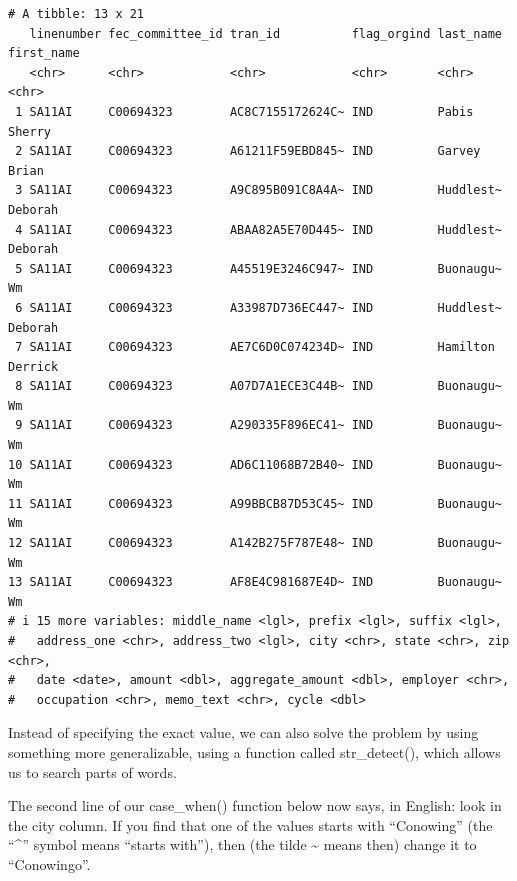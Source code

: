 \documentclass[
  letterpaper,
  DIV=11,
  numbers=noendperiod]{scrreprt}
\begin{document}
\begin{verbatim}
# A tibble: 13 x 21
   linenumber fec_committee_id tran_id          flag_orgind last_name first_name
   <chr>      <chr>            <chr>            <chr>       <chr>     <chr>     
 1 SA11AI     C00694323        AC8C7155172624C~ IND         Pabis     Sherry    
 2 SA11AI     C00694323        A61211F59EBD845~ IND         Garvey    Brian     
 3 SA11AI     C00694323        A9C895B091C8A4A~ IND         Huddlest~ Deborah   
 4 SA11AI     C00694323        ABAA82A5E70D445~ IND         Huddlest~ Deborah   
 5 SA11AI     C00694323        A45519E3246C947~ IND         Buonaugu~ Wm        
 6 SA11AI     C00694323        A33987D736EC447~ IND         Huddlest~ Deborah   
 7 SA11AI     C00694323        AE7C6D0C074234D~ IND         Hamilton  Derrick   
 8 SA11AI     C00694323        A07D7A1ECE3C44B~ IND         Buonaugu~ Wm        
 9 SA11AI     C00694323        A290335F896EC41~ IND         Buonaugu~ Wm        
10 SA11AI     C00694323        AD6C11068B72B40~ IND         Buonaugu~ Wm        
11 SA11AI     C00694323        A99BBCB87D53C45~ IND         Buonaugu~ Wm        
12 SA11AI     C00694323        A142B275F787E48~ IND         Buonaugu~ Wm        
13 SA11AI     C00694323        AF8E4C981687E4D~ IND         Buonaugu~ Wm        
# i 15 more variables: middle_name <lgl>, prefix <lgl>, suffix <lgl>,
#   address_one <chr>, address_two <lgl>, city <chr>, state <chr>, zip <chr>,
#   date <date>, amount <dbl>, aggregate_amount <dbl>, employer <chr>,
#   occupation <chr>, memo_text <chr>, cycle <dbl>
\end{verbatim}

Instead of specifying the exact value, we can also solve the problem by
using something more generalizable, using a function called
str\_detect(), which allows us to search parts of words.

The second line of our case\_when() function below now says, in English:
look in the city column. If you find that one of the values starts with
``Conowing'' (the ``\^{}'' symbol means ``starts with''), then (the
tilde \textasciitilde{} means then) change it to ``Conowingo''.
\end{document}
